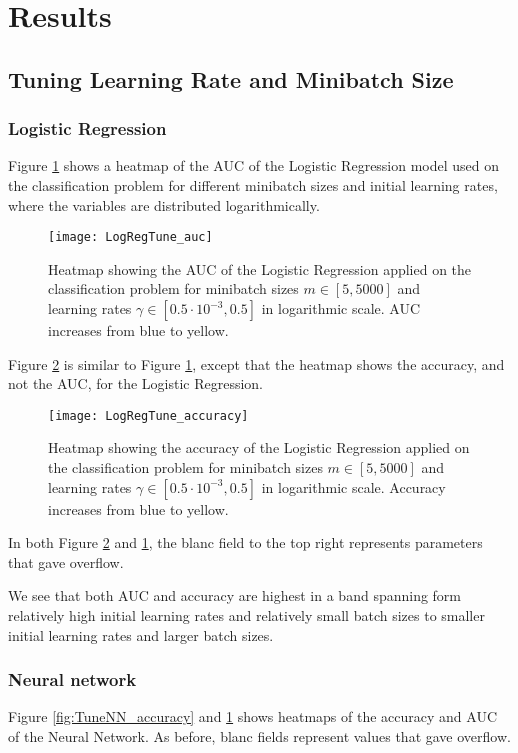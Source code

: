 \section{Results}
\label{sec:results}

\subsection{Tuning Learning Rate and Minibatch Size}

\subsubsection*{Logistic Regression}
Figure \ref{fig:TuneLogReg_auc} shows a heatmap of the AUC of the Logistic Regression model used on the classification problem for different minibatch sizes and initial learning rates, where the variables are distributed logarithmically.
\begin{figure}[htbp]
	\centering
	\texttt{[image: LogRegTune\_auc]}
	\caption{Heatmap showing the AUC of the Logistic Regression applied on the classification problem for minibatch sizes $m\in[5, 5000]$ and learning rates $\gamma\in[0.5\cdot10^{-3}, 0.5]$ in logarithmic scale. AUC increases from blue to yellow.}
	\label{fig:TuneLogReg_auc}
\end{figure}

Figure \ref{fig:TuneLogReg_accuracy} is similar to Figure \ref{fig:TuneLogReg_auc}, except that the heatmap shows the accuracy, and not the AUC, for the Logistic Regression.
\begin{figure}[htbp]
	\centering
	\texttt{[image: LogRegTune\_accuracy]}
	\caption{Heatmap showing the accuracy of the Logistic Regression applied on the classification problem for minibatch sizes $m\in[5, 5000]$ and learning rates $\gamma\in[0.5\cdot10^{-3}, 0.5]$ in logarithmic scale. Accuracy increases from blue to yellow.}
	\label{fig:TuneLogReg_accuracy}
\end{figure}

In both Figure \ref{fig:TuneLogReg_accuracy} and \ref{fig:TuneLogReg_auc}, the blanc field to the top right represents parameters that gave overflow.

We see that both AUC and accuracy are highest in a band spanning form relatively high initial learning rates and relatively small batch sizes to smaller initial learning rates and larger batch sizes.

\subsubsection*{Neural network}
Figure \ref{fig:TuneNN_accuracy} and \ref{fig:TuneLogReg_auc} shows heatmaps of the accuracy and AUC of the Neural Network. As before, blanc fields represent values that gave overflow.

